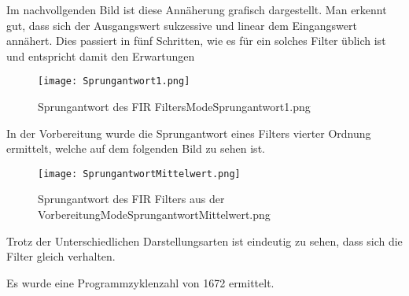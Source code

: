 Im nachvollgenden Bild ist diese Ann\"aherung grafisch dargestellt. Man erkennt gut, dass sich der Ausgangswert sukzessive und linear dem Eingangswert ann\"ahert. 
Dies passiert in f\"unf Schritten, wie es f\"ur ein solches Filter \"ublich ist und entspricht damit den Erwartungen
\begin{figure}[H]
  \centering
    \texttt{[image: Sprungantwort1.png]}
  \caption{Sprungantwort des FIR Filters\textunderscore Mode\textunderscore Sprungantwort1.png}
  \label{fig:SprAW1.png}%
\end{figure}
 In der Vorbereitung wurde die Sprungantwort eines Filters vierter Ordnung ermittelt, welche auf dem folgenden Bild zu sehen ist.
 \begin{figure}[H]
  \centering
    \texttt{[image: SprungantwortMittelwert.png]}
  \caption{Sprungantwort des FIR Filters aus der Vorbereitung\textunderscore Mode\textunderscore SprungantwortMittelwert.png}
  \label{fig:SprAW.png}%
\end{figure}
 Trotz der Unterschiedlichen Darstellungsarten ist eindeutig zu sehen, dass sich die Filter gleich verhalten.
 
 Es wurde eine Programmzyklenzahl von 1672 ermittelt.
 
